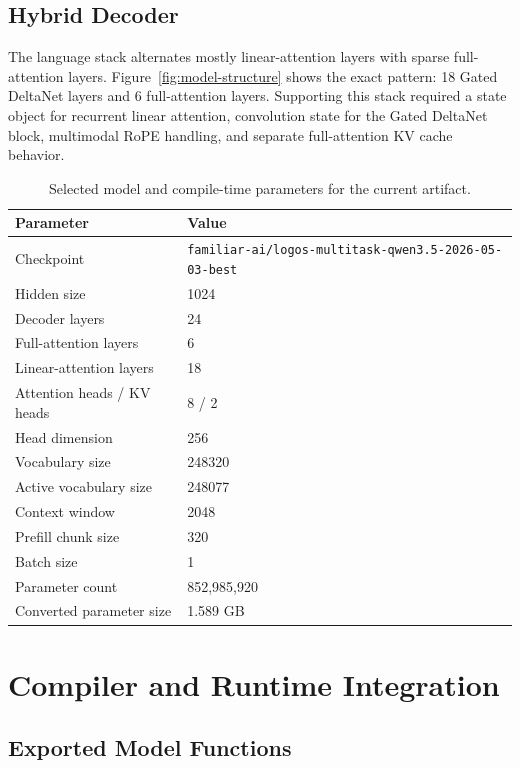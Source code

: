 \documentclass[10pt]{article}
\begin{document}
\subsection{Hybrid Decoder}

The language stack alternates mostly linear-attention layers with sparse
full-attention layers. Figure~\ref{fig:model-structure} shows the exact pattern:
18 Gated DeltaNet layers and 6 full-attention layers. Supporting this stack
required a state object for recurrent linear attention, convolution state for
the Gated DeltaNet block, multimodal RoPE handling, and separate full-attention
KV cache behavior.

\begin{table}[t]
  \centering
  \caption{Selected model and compile-time parameters for the current artifact.}
  \label{tab:model-config}
  \begin{tabular}{ll}
    \toprule
    Parameter & Value \\
    \midrule
    Checkpoint & \texttt{familiar-ai/logos-multitask-qwen3.5-2026-05-03-best} \\
    Hidden size & 1024 \\
    Decoder layers & 24 \\
    Full-attention layers & 6 \\
    Linear-attention layers & 18 \\
    Attention heads / KV heads & 8 / 2 \\
    Head dimension & 256 \\
    Vocabulary size & 248320 \\
    Active vocabulary size & 248077 \\
    Context window & 2048 \\
    Prefill chunk size & 320 \\
    Batch size & 1 \\
    Parameter count & 852,985,920 \\
    Converted parameter size & 1.589 GB \\
    \bottomrule
  \end{tabular}
\end{table}

\section{Compiler and Runtime Integration}

\subsection{Exported Model Functions}
\end{document}
